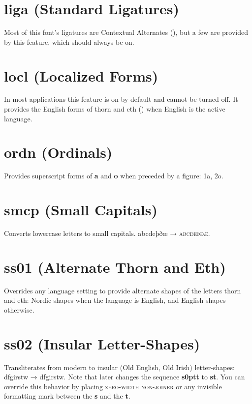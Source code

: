 \documentclass[12pt,letterpaper,openany]{book}
\begin{document}
\section{liga (Standard Ligatures)}
Most of this font’s ligatures are Contextual Alternates (), but a few
are provided by this feature, which should always be on.

\section{locl (Localized Forms)}
In most applications this feature is on by default and cannot be turned off.
It provides the English forms of thorn and eth
(\textbf{}) when English is the
active language.

\section{ordn (Ordinals)}
Provides superscript forms of \textbf{a} and \textbf{o} when preceded by a figure:
{ 1a, 2o}.

\section{smcp (Small Capitals)}
Converts lowercase letters to small capitals. abcdeþðæ → \textsc{abcdeþðæ}.

\section{ss01 (Alternate Thorn and Eth)}
Overrides any language setting to provide alternate shapes of the letters thorn and eth: Nordic shapes when the language is English, and English shapes otherwise.

\section{ss02 (Insular Letter-Shapes)}
Transliterates from modern to insular (Old English, Old Irish) letter-shapes:\linebreak
dfgirstw → { dfgirstw}. Note that  later
changes the sequence \textbf{ s\kern0ptt}
to \textbf{ st}. You can override this behavior by placing
 \textsc{zero-width non-joiner} or any invisible formatting mark
between the \textbf{s} and the \textbf{t}.
\end{document}
